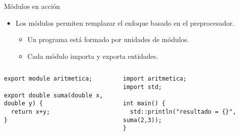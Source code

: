\begin{frame}[t,fragile]{Módulos en acción}
\begin{itemize}
  \item Los módulos permiten remplazar el enfoque basado en el preprocesador.
    \begin{itemize}
      \item Un programa está formado por unidades de módulos.
      \item Cada módulo importa y exporta entidades.
    \end{itemize}
\end{itemize}

\begin{columns}[T]

\begin{lstlisting}
export module aritmetica;

export double suma(double x, double y) {
  return x+y;
}
\end{lstlisting}

\begin{lstlisting}
import aritmetica;
import std;

int main() {
  std::println("resultado = {}", suma(2,3));
}
\end{lstlisting}

\begin{lstlisting}
\end{lstlisting}

\end{columns}
\end{frame}
